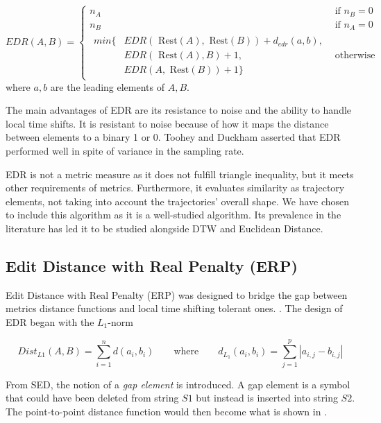 \begin{equation}\label{eq:edr_main}
    EDR(A, B) = \begin{cases}
        n_A \qquad &\text{if } n_B = 0\\
        n_B \qquad &\text{if } n_A = 0\\
        \begin{aligned}
        min\big\{ & EDR(\text{ Rest}(A), \text{ Rest}(B)) + d_{edr}(a, b),\\
              & EDR(\text{ Rest}(A), B) + 1,\\
              & EDR(A, \text{ Rest}(B)) + 1 \big\}
        \end{aligned} & \text{otherwise}
  \end{cases}
\end{equation}where $a, b$ are the leading elements of $A, B$.  

The main advantages of EDR are its resistance to noise and the ability to handle local time shifts. 
It is resistant to noise because of how it maps the distance between elements to a binary 1 or 0. 
Toohey and Duckham asserted that EDR performed well in spite of variance in the sampling rate\cite{17-TrajectorySimilarity}.

EDR is not a metric measure as it does not fulfill triangle inequality, but it meets other requirements of metrics. 
Furthermore, it evaluates similarity as trajectory elements, not taking into account the trajectories' overall shape. 
We have chosen to include this algorithm as it is a well-studied algorithm. 
Its prevalence in the literature has led it to be studied alongside DTW and Euclidean Distance. 


\subsection{Edit Distance with Real Penalty (ERP) }
Edit Distance with Real Penalty (ERP) was designed to bridge the gap between metrics distance functions and local time shifting tolerant ones. \cite{13-MarriageLpnorms}. The design of EDR began with the $L_1$-norm 

\begin{equation}\label{eq:manhatten}
Dist_{L1} (A, B) = \sum_{i=1}^{n} d(a_i, b_i) \qquad \text{where} \qquad d_{L_1}(a_i, b_i) = \sum_{j=1}^{p}|a_{i,j}- b_{i,j}|
\end{equation}

From SED, the notion of a \textit{gap element} is introduced. 
A gap element is a symbol that could have been deleted from string $S1$ but instead is inserted into string $S2$.
The point-to-point distance function would then become what is shown in . 

